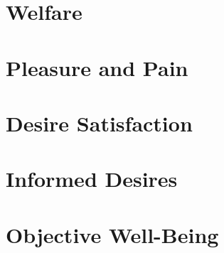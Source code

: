 \section{Welfare}

\section{Pleasure and Pain}

\section{Desire Satisfaction}

\section{Informed Desires}

\section{Objective Well-Being}
